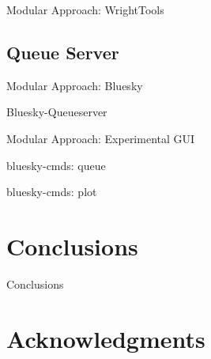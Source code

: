 \documentclass{presentation}
\begin{document}
\begin{frame}{Modular Approach: WrightTools}
\end{frame}


\subsection{Queue Server}

\begin{frame}{Modular Approach: Bluesky}
\end{frame}

\begin{frame}{Bluesky-Queueserver}
\end{frame}

\begin{frame}{Modular Approach: Experimental GUI}
\end{frame}

\begin{frame}{bluesky-cmds: queue}
\end{frame}
\begin{frame}{bluesky-cmds: plot}
\end{frame}


\section{Conclusions}

\begin{frame}{Conclusions}
\end{frame}

\section{Acknowledgments}
\end{document}
